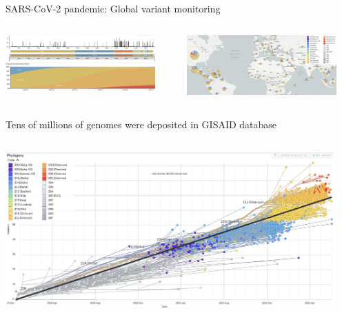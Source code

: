 \documentclass[10pt]{beamer}
\begin{document}
\begin{frame}{SARS-CoV-2 pandemic: Global variant monitoring}
	\begin{columns}
		\column{\dimexpr\paperwidth-10pt}
		\begin{center}
			\includegraphics[width=0.9\textwidth]{./figures/nextstrain-sars-cov2-cladetiming.png}\par
		\end{center}
		\begin{center}
			\includegraphics[width=0.9\textwidth]{./figures/nextstrain-sars-cov2-countrydistribution.png}\par
		\end{center}
	\end{columns}
\end{frame}

\begin{frame}{Tens of millions of genomes were deposited in GISAID database}
	\begin{columns}
		\column{\dimexpr\paperwidth-10pt}
		\begin{center}
			\includegraphics[width=0.95\textwidth]{./figures/nextstrain-sars-cov2-cladetiming-mutations.png}\par
		\end{center}
	\end{columns}
\end{frame}
\end{document}
